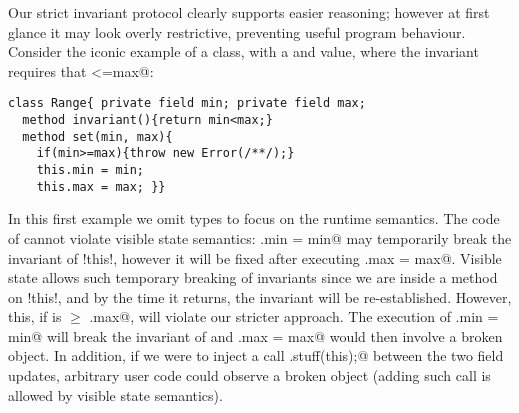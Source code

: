 Our strict invariant protocol clearly supports easier reasoning; however 
at first glance it may look overly restrictive, preventing useful program behaviour.
Consider the iconic example of a \Q@Range@ class, with a \Q@min@ and \Q@max@
value, where the invariant requires that \Q@min<=max@:
\begin{lstlisting}
class Range{ private field min; private field max;
  method invariant(){return min<max;}
  method set(min, max){
    if(min>=max){throw new Error(/**/);}
    this.min = min;
    this.max = max; }}
\end{lstlisting}
In this first example we omit types to focus on the runtime semantics.
The code of \Q@set@ cannot violate visible state semantics:
\Q@this.min = min@ may temporarily break the invariant of \Q!this!, however it will be fixed after executing \Q@this.max = max@. Visible state allows such temporary breaking of invariants since we are inside a method on \Q!this!, and by the time it returns, the invariant will be re-established.
However, this, if \Q@min@ is $\geq$ \Q@this.max@, \Q@set@ will violate our stricter approach. The execution of
\Q@this.min = min@ will break the invariant of \Q@this@ and \Q@this.max = max@ would then involve a broken object. In addition, if we were to inject a call
\Q@Do.stuff(this);@ between the two field updates, arbitrary user code could observe a broken object (adding such call is allowed by visible state semantics).

